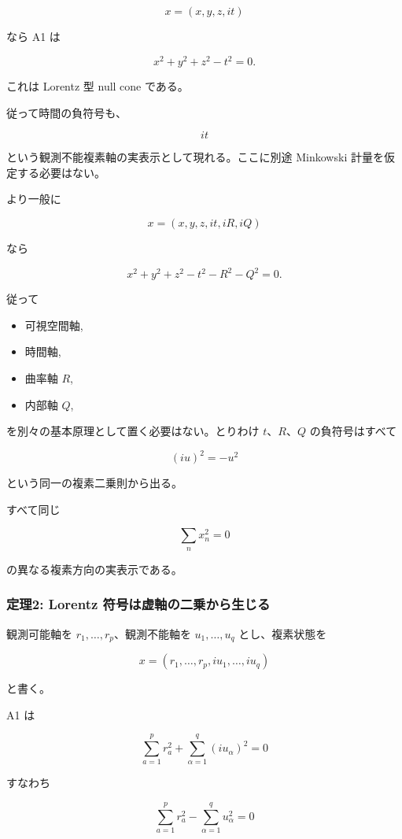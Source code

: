 \documentclass[
  a4paper,
]{ltjsarticle}
\providecommand{\tightlist}{%
  \setlength{\itemsep}{0pt}\setlength{\parskip}{0pt}}
\begin{document}
\[
x=(x,y,z,it)
\]

なら A1 は

\[
x^2+y^2+z^2-t^2=0.
\]

これは Lorentz 型 null cone である。

従って時間の負符号も、

\[
\boxed{it}
\]

という観測不能複素軸の実表示として現れる。ここに別途 Minkowski
計量を仮定する必要はない。

より一般に

\[
x=(x,y,z,it,iR,iQ)
\]

なら

\[
\boxed{
x^2+y^2+z^2-t^2-R^2-Q^2=0
}.
\]

従って

\begin{itemize}
\tightlist
\item
  可視空間軸,
\item
  時間軸,
\item
  曲率軸 \(R\),
\item
  内部軸 \(Q\),
\end{itemize}

を別々の基本原理として置く必要はない。とりわけ \(t\)、\(R\)、\(Q\)
の負符号はすべて

\[
\boxed{(iu)^2=-u^2}
\]

という同一の複素二乗則から出る。

すべて同じ

\[
\boxed{
\sum_nx_n^2=0
}
\]

の異なる複素方向の実表示である。

\subsubsection{定理2: Lorentz
符号は虚軸の二乗から生じる}\label{ux5b9aux74062-lorentz-ux7b26ux53f7ux306fux865aux8ef8ux306eux4e8cux4e57ux304bux3089ux751fux3058ux308b}

観測可能軸を \(r_1,\ldots,r_p\)、観測不能軸を \(u_1,\ldots,u_q\)
とし、複素状態を

\[
x=(r_1,\ldots,r_p,iu_1,\ldots,iu_q)
\]

と書く。

A1 は

\[
\sum_{a=1}^{p}r_a^2+\sum_{\alpha=1}^{q}(iu_\alpha)^2=0
\]

すなわち

\[
\boxed{
\sum_{a=1}^{p}r_a^2-\sum_{\alpha=1}^{q}u_\alpha^2=0
}
\]
\end{document}
